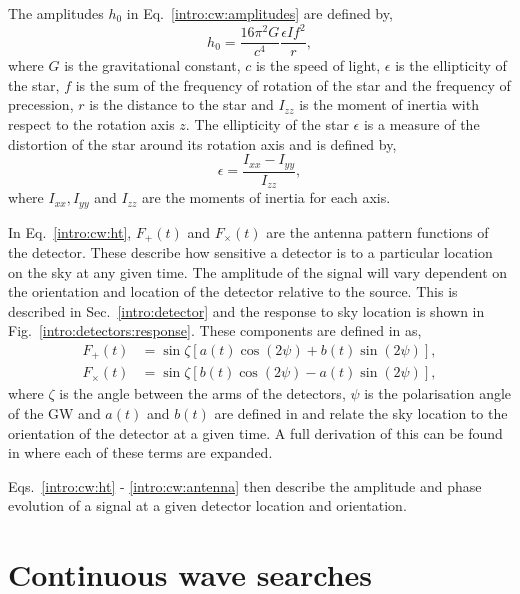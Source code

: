The amplitudes $h_0$ in Eq.~\ref{intro:cw:amplitudes} are defined by,
\begin{equation}
    h_0 = \frac{16 \pi^2 G}{c^4} \frac{\epsilon I f^2}{r},
\end{equation}
where $G$ is the gravitational constant, $c$ is the speed of light, $\epsilon$ is the ellipticity of the star, $f$ is the sum of the frequency of rotation of the star and the frequency of precession, $r$ is the distance to the star and $I_{zz}$ is the moment of inertia with respect to the rotation axis $z$.
The ellipticity of the star $\epsilon$ is a measure of the distortion of the star around its rotation axis and is defined by,
\begin{equation}
    \epsilon = \frac{I_{xx} - I_{yy}}{I_{zz}},
\end{equation}
where $I_{xx}, I_{yy}$ and $I_{zz}$ are the moments of inertia for each axis.

In Eq.~\ref{intro:cw:ht}, $F_+(t)$ and $F_{\times}(t)$ are the antenna pattern functions of the detector. 
These describe how sensitive a detector is to a particular location on the sky at any given time. 
The amplitude of the signal will vary dependent on the orientation and location of the detector relative to the source.
This is described in Sec.~\ref{intro:detector} and the response to sky location is shown in Fig.~\ref{intro:detectors:response}.
These components are defined in \citep{schutz1998DataAnalysis} as,
\begin{equation}
\label{intro:cw:antenna}
\begin{split}
F_{+}(t) &= \sin{\zeta}[a(t)\cos{(2\psi)} + b(t)\sin{(2\psi)}], \\
F_{\times}(t) &= \sin{\zeta}[b(t) \cos{(2\psi)} - a(t)\sin{(2\psi)}],
\end{split}
\end{equation}
where $\zeta$ is the angle between the arms of the detectors, $\psi$ is the polarisation angle of the \ac{GW} and $a(t)$ and $b(t)$ are defined in \citep{schutz1998DataAnalysis} and relate the sky location to the orientation of the detector at a given time. 
A full derivation of this can be found in \citep{schutz1998DataAnalysis} where each of these terms are expanded.

Eqs.~\ref{intro:cw:ht} - \ref{intro:cw:antenna} then describe the amplitude and phase evolution of a signal at a given detector location and orientation.


\section{\label{searchcw:search} Continuous wave searches}

